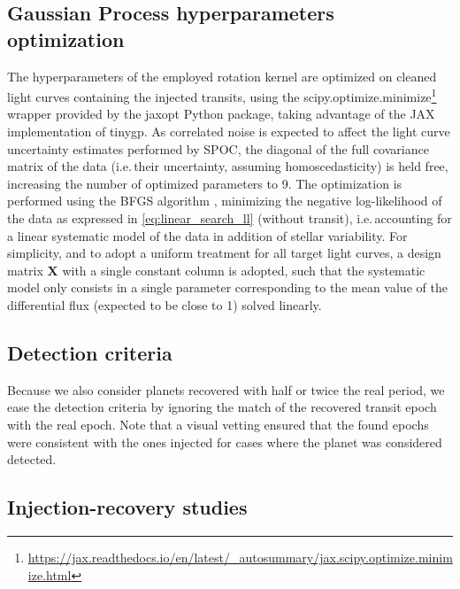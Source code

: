 \documentclass{aastex631}
\newcommand{\footlink}[1]{\footnote{\url{#1}}}
\begin{document}
\subsection{Gaussian Process hyperparameters optimization}
The hyperparameters of the employed rotation kernel are optimized on cleaned light curves containing the injected transits, using the \textsf{scipy.optimize.minimize}\footlink{https://jax.readthedocs.io/en/latest/_autosummary/jax.scipy.optimize.minimize.html} wrapper provided by the \textsf{jaxopt} Python package, taking advantage of the \textsf{JAX} implementation of \textsf{tinygp}. As correlated noise is expected to affect the light curve uncertainty estimates performed by SPOC, the diagonal of the full covariance matrix of the data (i.e.\,their uncertainty, assuming homoscedasticity) is held free, increasing the number of optimized parameters to 9. The optimization is performed using the \textsf{BFGS} algorithm \citep{Fletcher1987}, minimizing the negative log-likelihood of the data as expressed in \autoref{eq:linear_search_ll} (without transit), i.e.\,accounting for a linear systematic model of the data in addition of stellar variability. For simplicity, and to adopt a uniform treatment for all target light curves, a design matrix $\bm{X}$ with a single constant column is adopted, such that the systematic model only consists in a single parameter corresponding to the mean value of the differential flux (expected to be close to 1) solved linearly.

\subsection{Detection criteria}
Because we also consider planets recovered with half or twice the real period, we ease the detection criteria by ignoring the match of the recovered transit epoch with the real epoch. Note that a visual vetting ensured that the found epochs were consistent with the ones injected for cases where the planet was considered detected.

\subsection{Injection-recovery studies}
\end{document}
